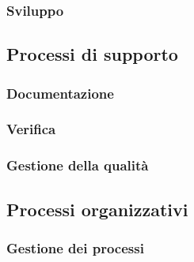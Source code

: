 \documentclass[10pt, letterpaper]{article}
\begin{document}
\begin{table}[H]
    \subsubsection{Sviluppo}
    \caption{Tabella dei valori soglia per metriche di sviluppo}
\end{table}


\begin{table}[H]
    \subsection{Processi di supporto}
    \subsubsection{Documentazione}
    \caption{Tabella dei valori soglia per metriche di documentazione}
\end{table}

\begin{table}[H]
    \subsubsection{Verifica}
    \caption{Tabella dei valori soglia per metriche di verifica}
\end{table}

\begin{table}[H]
    \subsubsection{Gestione della qualità}
    \caption{Tabella dei valori soglia per metriche di gestione della qualità}
\end{table}

\begin{table}[H]
    \subsection{Processi organizzativi}
    \subsubsection{Gestione dei processi}
    \caption{Tabella dei valori soglia per metriche di gestione dei processi}
\end{table}
\end{document}
